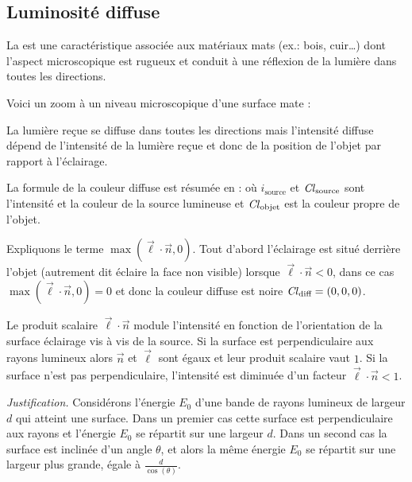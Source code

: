 \documentclass[11pt,class=report,crop=false]{standalone}
\begin{document}
\subsection{Luminosité diffuse}



La  est une caractéristique associée aux matériaux mats (ex.: bois, cuir\ldots) dont l'aspect microscopique est rugueux et conduit à une réflexion de la lumière dans toutes les directions.

Voici un zoom à un niveau microscopique d'une surface mate :

La lumière reçue se diffuse dans toutes les directions mais l'intensité diffuse dépend de l'intensité de la lumière reçue et donc de la position de l'objet par rapport à l'éclairage.




La formule de la couleur diffuse est résumée en :
où $i_{\text{source}}$ et $\operatorname{\it Cl}_{\text{source}}$ sont l'intensité et la couleur de la source lumineuse et $\operatorname{\it Cl}_{\text{objet}}$ est la couleur propre de l'objet.

Expliquons le terme $\max(\vec\ell\cdot\vec n,0)$. Tout d'abord l'éclairage est situé derrière l'objet (autrement dit éclaire la face non visible) lorsque $\vec\ell\cdot\vec n < 0$, dans ce cas $\max(\vec\ell\cdot\vec n,0)=0$ et donc la couleur diffuse est noire $\operatorname{\it Cl}_{\text{diff}} = (0,0,0)$.

Le produit scalaire $\vec\ell\cdot\vec n$ module l'intensité en fonction de l'orientation de la surface éclairage vis à vis de la source.
Si la surface est perpendiculaire aux rayons lumineux alors $\vec n$ et $\vec \ell$ sont égaux et leur produit scalaire vaut 
$1$. Si la surface n'est pas perpendiculaire, l'intensité est diminuée d'un facteur $\vec\ell\cdot\vec n < 1$.

\medskip

\emph{Justification.}
Considérons l'énergie $E_0$ d'une bande de rayons lumineux de largeur $d$ qui atteint une surface. Dans un premier cas cette surface est perpendiculaire aux rayons et l'énergie $E_0$ se répartit sur une largeur $d$. Dans un second cas la surface est inclinée d'un angle $\theta$, et alors la même énergie $E_0$ se répartit sur une largeur plus grande, égale à $\frac{d}{\cos(\theta)}$.
\end{document}
